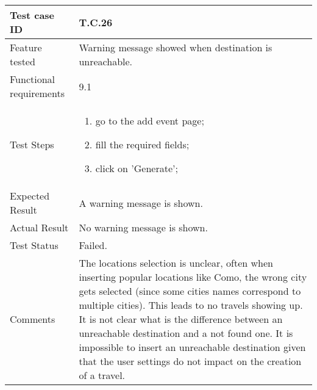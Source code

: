 \begin{table}[H]
	\begin{center}
		\begin{tabular}{ | p{} | p{} | }
		\hline
		Test case ID & T.C.26\\
		\hline
		Feature tested & Warning message showed when destination is unreachable.\\
    	\hline
		Functional requirements & 9.1  \\
		\hline
		Test Steps & 
			\begin{enumerate}
				\item go to the add event page;
				\item fill the required fields;
				\item click on 'Generate';
			\end{enumerate} \\
		\hline
		Expected Result & A warning message is shown.\\
		\hline
		Actual Result & No warning message is shown.\\ 
		\hline
		Test Status & \color{Red}Failed.\\ 
		\hline
		Comments & The locations selection is unclear, often when inserting popular locations like Como, the wrong city gets selected (since some cities names correspond to multiple cities). This leads to no travels showing up. It is not clear what is the difference between an unreachable destination and a not found one. It is impossible to insert an unreachable destination given that the user settings do not impact on the creation of a travel. \\
		\hline
		
		\end{tabular}
	\end{center}
\end{table}

